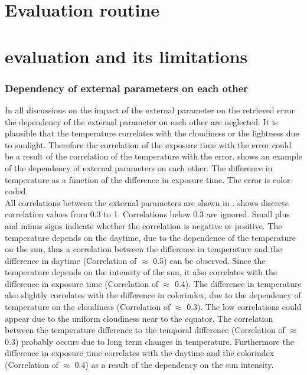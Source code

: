 \documentclass  [
  paper    = a4,
  BCOR     = 10mm,
  twoside,
  fontsize = 12pt,
  fleqn,
  toc      = bibnumbered,
  toc      = listofnumbered,
  numbers  = noendperiod,
  headings = normal,
  listof   = leveldown,
  version  = 3.03
]                                       {scrreprt}
\begin{document}
	\chapter{Evaluation routine\label{Chap:evalroutine}}
	
	\chapter{  evaluation and its limitations}
	
	

	\subsection*{Dependency of external parameters on each other}
	In all discussions on the impact of the external parameter on the retrieved   error the  dependency of the external parameter on each other are neglected. It is plausible that the temperature correlates with the cloudiness or the lightness due to sunlight. Therefore the correlation of the exposure time with the   error could be a result of the correlation of the temperature with the   error.  shows an example of the dependency of external parameters on each other. The difference in temperature as a function of the difference in exposure time. The   error is color-coded. \\
	All correlations between the external parameters are shown in .  shows discrete correlation values from 0.3 to 1. Correlations below 0.3 are ignored. Small plus and minus signs indicate whether the correlation is negative or positive. 
	The temperature depends on the daytime, due to the dependence of the temperature on the sun, thus a correlation between the  difference in temperature and the difference in daytime (Correlation of $\approx$ 0.5) can be observed. Since the temperature depends on the intensity of the sun, it also correlates with  the difference in exposure time (Correlation of $\approx$ 0.4). The difference in temperature also slightly correlates with the difference in colorindex, due to the dependency of temperature on the cloudiness (Correlation of $\approx$ 0.3). The low correlations could appear due to the uniform cloudiness near to the equator. The correlation between the temperature difference to the temporal difference (Correlation of $\approx$ 0.3) probably occurs due to long term changes in temperature. Furthermore the difference in exposure time correlates with the daytime and the colorindex (Correlation of $\approx$ 0.4) as a result of the dependency on the sun intensity.\\
\end{document}
